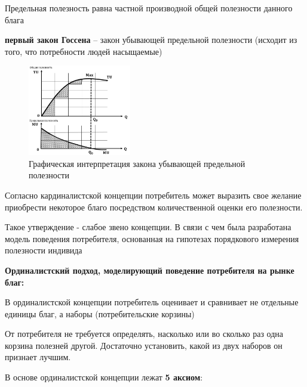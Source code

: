 \documentclass[reqno]{article}
\theoremstyle{definition}
\theoremstyle{definition}
\theoremstyle{definition}
\theoremstyle{definition}
\theoremstyle{definition}
\theoremstyle{definition}
\theoremstyle{definition}
\theoremstyle{definition}
\theoremstyle{definition}
\begin{document}
			Предельная полезность равна частной производной общей полезности данного блага
			
			\textbf{первый закон Госсена} -- закон убывающей предельной полезности (исходит из того, что потребности людей насыщаемые)
			
			\begin{figure}[h!]
				\centering
				\includegraphics[width=0.4\textwidth]{Предельная_полезность}
				\caption{Графическая интерпретация закона убывающей предельной полезности}
			\end{figure}
			
			Согласно кардиналистской концепции потребитель может выразить свое желание приобрести некоторое благо посредством количественной оценки его полезности.
			
			Такое утверждение - слабое звено концепции. В связи с чем была разработана модель поведения потребителя, основанная на гипотезах порядкового измерения полезности индивида
			
			\textbf{Ординалистский подход, моделирующий поведение потребителя на рынке благ:}
			
			В ординалистской концепции потребитель оценивает и сравнивает не отдельные единицы благ, а наборы (потребительские корзины)
			
			От потребителя не требуется определять, насколько или во сколько раз одна корзина полезней другой. Достаточно установить, какой из двух наборов он признает лучшим.
			
			В основе ординалистской концепции лежат \textbf{5 аксиом}: 
			
\end{document}
